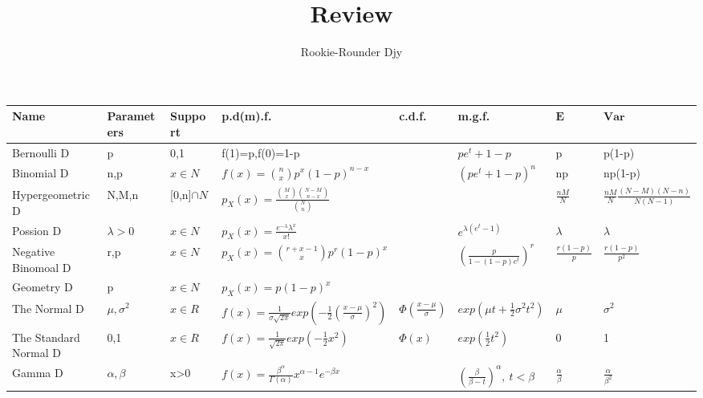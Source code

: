 \documentclass[landscape,12pt,a3paper]{article}
\title{Review}
\author{Rookie-Rounder Djy}
\begin{document}
    
\maketitle

\begin{table}[H]
    \begin{tabular}[7]{|l|l|l|l|l|l|l|l|}
    \hline
    Name & Parameters & Support & p.d(m).f. & c.d.f. & m.g.f. & $\mathbf{E}$ & $\mathbf{Var}$ \\ \hline
    Bernoulli D & p & 0,1 & f(1)=p,f(0)=1-p &  & $pe^{t}+1-p$ & p & p(1-p) \\ \hline
    Binomial D & n,p & $x\in N$ & $f(x)=\binom{n}{x}p^x(1-p)^{n-x}$ &  & $(pe^t+1-p)^n$ & np & np(1-p) \\ \hline
    Hypergeometric D & N,M,n & [0,n]$\cap N$ &  $\displaystyle p_X(x)=\frac{\binom{M}{x}\binom{N-M}{n-x}}{\binom{N}{n}}$\hfill &  &  & $\displaystyle \frac{nM}{N}$ & $\displaystyle \frac{nM}{N}\frac{(N-M)(N-n)}{N(N-1)}$ \\ \hline
    Possion D & $\lambda>0$ & $x\in N$ & $\displaystyle p_X(x)=\frac{e^{-\lambda}\lambda^x}{x!}$ &  & $e^{\lambda(e^t-1)}$ & $\lambda$ & $\lambda$ \\ \hline
    Negative Binomoal D & r,p & $x\in N$ & $\displaystyle p_X(x)=\binom{r+x-1}{x}p^r(1-p)^x$ &  & $\displaystyle \left(\frac{p}{1-(1-p)e^t}\right)^r$ & $\displaystyle \frac{r(1-p)}{p}$ & $\displaystyle \frac{r(1-p)}{p^2}$ \\ \hline
    Geometry D & p & $x\in N$ & $\displaystyle p_X(x)=p(1-p)^x$ &  &  &  & \\ \hline
    The Normal D & $\mu,\sigma^2$ & $x\in R$ & $\displaystyle f(x)=\frac{1}{\sigma\sqrt{2\pi}}exp\left(-\frac{1}{2}\left(\frac{x-\mu}{\sigma}\right)^2\right)$ & $\displaystyle \Phi\left(\frac{x-\mu}{\sigma}\right)$ & $\displaystyle exp\left(\mu t+\frac{1}{2}\sigma^2t^2\right)$ & $\displaystyle \mu$ & $\displaystyle \sigma^2$\\ \hline
    The Standard Normal D & 0,1 & $x\in R$ & $\displaystyle f(x)=\frac{1}{\sqrt{2\pi}}exp\left(-\frac{1}{2}x^2\right)$ & $\displaystyle \Phi(x)$ & $\displaystyle exp\left(\frac{1}{2}t^2\right)$ & 0 & 1 \\ \hline
    Gamma D & $\displaystyle \alpha,\beta$ & x>0 & $\displaystyle f(x)=\frac{\beta^\alpha}{\Gamma(\alpha)}x^{\alpha-1}e^{-\beta x}$ &  & $\displaystyle \left(\frac{\beta}{\beta-t}\right)^\alpha,~t<\beta$ & $\displaystyle \frac{\alpha}{\beta}$ & $\displaystyle \frac{\alpha}{\beta^2}$ \\ \hline

\end{tabular}
\end{table}
\end{document}
